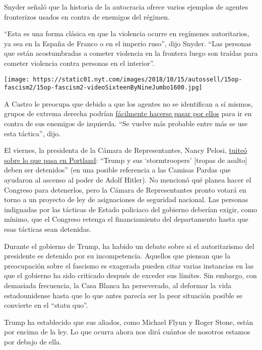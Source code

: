 Snyder señaló que la historia de la autocracia ofrece varios ejemplos de
agentes fronterizos usados en contra de enemigos del régimen.

``Esta es una forma clásica en que la violencia ocurre en regímenes
autoritarios, ya sea en la España de Franco o en el imperio ruso'', dijo
Snyder. ``Las personas que están acostumbradas a cometer violencia en la
frontera luego son traídas para cometer violencia contra personas en el
interior''.

\texttt{[image: https://static01.nyt.com/images/2018/10/15/autossell/15op-fascism2/15op-fascism2-videoSixteenByNineJumbo1600.jpg]}

A Castro le preocupa que debido a que los agentes no se identifican a sí
mismos, grupos de extrema derecha podrían
\href{https://twitter.com/JoaquinCastrotx/status/1284956181400899585?s=20}{fácilmente
hacerse pasar por ellos} para ir en contra de sus enemigos de izquierda.
``Se vuelve más probable entre más se use esta táctica'', dijo.

El viernes, la presidenta de la Cámara de Representantes, Nancy Pelosi,
\href{https://twitter.com/SpeakerPelosi/status/1284294427654197248?s=20}{tuiteó
sobre lo que pasa en Portland}: ``Trump y sus `stormtroopers' {[}tropas
de asalto{]} deben ser detenidos'' (en una posible referencia a las
Camisas Pardas que ayudaron al ascenso al poder de Adolf Hitler). No
mencionó qué planea hacer el Congreso para detenerlos, pero la Cámara de
Representantes pronto votará en torno a un proyecto de ley de
asignaciones de seguridad nacional. Las personas indignadas por las
tácticas de Estado policiaco del gobierno deberían exigir, como mínimo,
que el Congreso retenga el financiamiento del departamento hasta que
esas tácticas sean detenidas.

Durante el gobierno de Trump, ha habido un debate sobre si el
autoritarismo del presidente es detenido por su incompetencia. Aquellos
que piensan que la preocupación sobre el fascismo es exagerada pueden
citar varias instancias en las que el gobierno ha sido criticado después
de exceder sus límites. Sin embargo, con demasiada frecuencia, la Casa
Blanca ha perseverado, al deformar la vida estadounidense hasta que lo
que antes parecía ser la peor situación posible se convierte en el
``statu quo''.

Trump ha establecido que sus aliados, como Michael Flynn y Roger Stone,
están por encima de la ley. Lo que ocurra ahora nos dirá cuántos de
nosotros estamos por debajo de ella.

